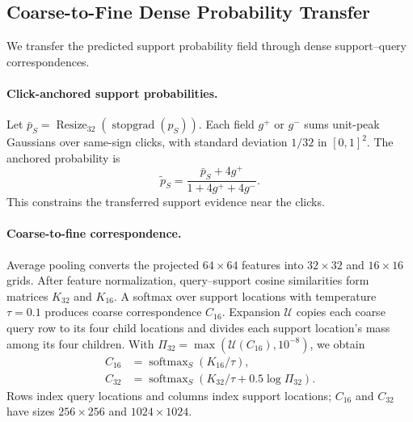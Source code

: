 \subsection{Coarse-to-Fine Dense Probability Transfer}
\label{sec:transfer}
We transfer the predicted support probability field through dense support--query correspondences.

\paragraph{Click-anchored support probabilities.}
Let $\bar p_S=\operatorname{Resize}_{32}(\operatorname{stopgrad}(p_S))$. Each field $g^+$ or $g^-$ sums unit-peak Gaussians over same-sign clicks, with standard deviation $1/32$ in $[0,1]^2$. The anchored probability is
\begin{equation}
 \widetilde p_S=\frac{\bar p_S+4g^+}{1+4g^++4g^-}.
\label{eq:anchor}
\end{equation}
This constrains the transferred support evidence near the clicks.

\paragraph{Coarse-to-fine correspondence.}
Average pooling converts the projected $64\times64$ features into $32\times32$ and $16\times16$ grids. After feature normalization, query--support cosine similarities form matrices $K_{32}$ and $K_{16}$. A softmax over support locations with temperature $\tau=0.1$ produces coarse correspondence $C_{16}$. Expansion $\mathcal U$ copies each coarse query row to its four child locations and divides each support location's mass among its four children. With $\Pi_{32}=\max(\mathcal U(C_{16}),10^{-8})$, we obtain
\begin{align}
 C_{16}&=\operatorname{softmax}_{S}(K_{16}/\tau),\\
 C_{32}&=\operatorname{softmax}_{S}\!\left(K_{32}/\tau
                  +0.5\log \Pi_{32}\right).
\label{eq:correspondence}
\end{align}
Rows index query locations and columns index support locations; $C_{16}$ and $C_{32}$ have sizes $256\times256$ and $1024\times1024$.

